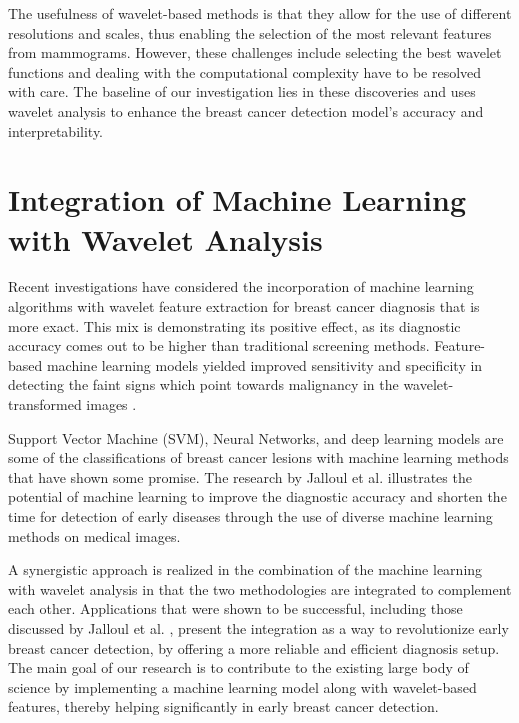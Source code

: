 The usefulness of wavelet-based methods is that they allow for the use of different resolutions and scales, thus enabling the selection of the most relevant features from mammograms. However, these challenges include selecting the best wavelet functions and dealing with the computational complexity have to be resolved with care. The baseline of our investigation lies in these discoveries and uses wavelet analysis to enhance the breast cancer detection model's accuracy and interpretability.
\section{Integration of Machine Learning with Wavelet Analysis}
Recent investigations have considered the incorporation of machine learning algorithms with wavelet feature extraction for breast cancer diagnosis that is more exact. This mix is demonstrating its positive effect, as its diagnostic accuracy comes out to be higher than traditional screening methods. Feature-based machine learning models yielded improved sensitivity and specificity in detecting the faint signs which point towards malignancy in the wavelet-transformed images \cite{Tumor}.

Support Vector Machine (SVM), Neural Networks, and deep learning models are some of the classifications of breast cancer lesions with machine learning methods that have shown some promise. The research by Jalloul et al. \cite{Ovarian} illustrates the potential of machine learning to improve the diagnostic accuracy and shorten the time for detection of early diseases through the use of diverse machine learning methods on medical images.

A synergistic approach is realized in the combination of the machine learning with wavelet analysis in that the two methodologies are integrated to complement each other. Applications that were shown to be successful, including those discussed by Jalloul et al. \cite{Ovarian}, present the integration as a way to revolutionize early breast cancer detection, by offering a more reliable and efficient diagnosis setup. The main goal of our research is to contribute to the existing large body of science by implementing a machine learning model along with wavelet-based features, thereby helping significantly in early breast cancer detection.
